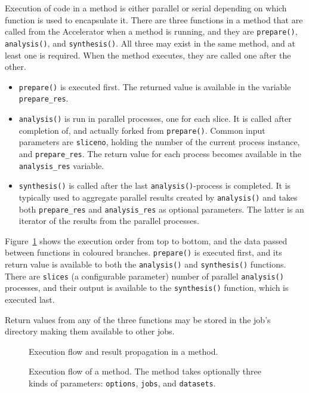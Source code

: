 Execution of code in a method is either parallel or serial depending
on which function is used to encapsulate it.  There are three
functions in a method that are called from the Accelerator when a
method is running, and they are \texttt{prepare()},
\texttt{analysis()}, and \texttt{synthesis()}.  All three may exist in
the same method, and at least one is required.  When the method
executes, they are called one after the other.
\begin{itemize}
\item[] \texttt{prepare()} is executed first.  The returned value is
  available in the variable \texttt{prepare\_res}.
\item[] \texttt{analysis()} is run in parallel processes, one for each
  slice.  It is called after completion of, and actually forked from
  \texttt{prepare()}.  Common input parameters are \texttt{sliceno},
  holding the number of the current process instance, and
  \texttt{prepare\_res}.  The return value for each process becomes
  available in the \texttt{analysis\_res} variable.
\item[] \texttt{synthesis()} is called after the last
  \texttt{analysis()}-process is completed.  It is typically used to
  aggregate parallel results created by \texttt{analysis()} and takes
  both \texttt{prepare\_res} and \texttt{analysis\_res} as optional
  parameters.  The latter is an iterator of the results from the
  parallel processes.
\end{itemize}
Figure~\ref{fig:prepanasyn} shows the execution order from top to
bottom, and the data passed between functions in coloured branches.
\texttt{prepare()} is executed first, and its return value is
available to both the \texttt{analysis()} and \texttt{synthesis()}
functions.  There are \texttt{slices} (a configurable parameter)
number of parallel \texttt{analysis()} processes, and their output is
available to the \texttt{synthesis()} function, which is executed
last.

Return values from any of the three functions may be stored in the
job's directory making them available to other jobs.


\begin{figure}[t]
  \begin{center}
    
    \caption{Execution flow and result propagation in a method.}
    \label{fig:prepanasyn}
  \end{center}
\end{figure}


\begin{figure}[b]
  \begin{center}
    
    \caption{Execution flow of a method.  The method takes optionally
      three kinds of parameters: \texttt{options}, \texttt{jobs},
      and \texttt{datasets}.}
    \label{fig:execflow}
  \end{center}
\end{figure}


